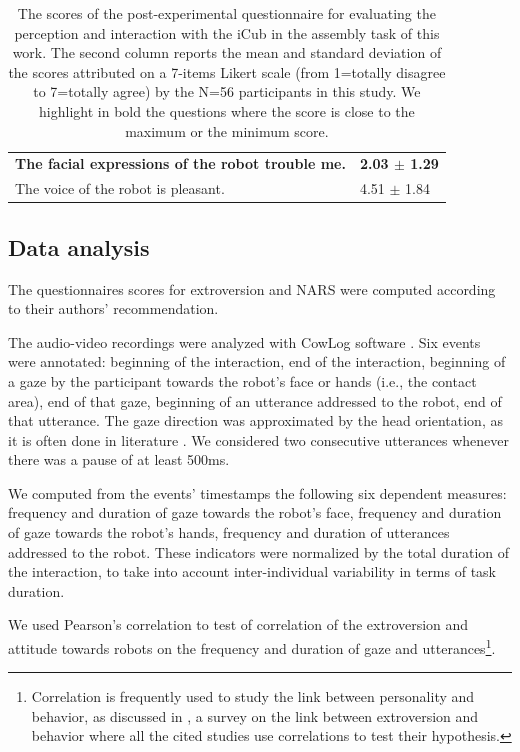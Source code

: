 \documentclass[twocolumn]{svjour3}          %
\begin{document}
\begin{table}
\begin{tabular}{|p{12cm}|p{3.5cm}|}
\textbf{The facial expressions of the robot trouble me.}& \textbf{2.03 $\pm$ 1.29}\\
 The voice of the robot is pleasant.& 4.51 $\pm$ 1.84\\
\hline
\end{tabular}
\caption{The scores of the post-experimental questionnaire for evaluating the perception and interaction with the iCub in the assembly task of this work. The second column reports the mean and standard deviation of the scores attributed on a 7-items Likert scale (from 1=totally disagree to 7=totally agree) by the N=56 participants in this study. We highlight in bold the questions where the score is close to the maximum or the minimum score.}
\label{table:postexperimentquestionnairescores}
\end{table}


\subsection{Data analysis}

The questionnaires scores for extroversion and NARS were computed according to their authors' recommendation. 

The audio-video recordings were analyzed with CowLog software \cite{CowLog2009}. 
 Six events were annotated: beginning of the interaction, end of the interaction, beginning of a gaze by the participant towards the robot's face or hands (i.e., the contact area), end of that gaze, beginning of an utterance addressed to the robot, end of that utterance. 
The gaze direction was approximated by the head orientation, as it is often done in literature \cite{ivaldi2014frontiers,Ba2009}. 
We considered two consecutive utterances whenever there was a pause of at least 500ms. 

We computed from the events' timestamps the following six dependent measures: frequency and duration of gaze towards the robot's face, frequency and duration of gaze towards the robot's hands, frequency and duration of utterances addressed to the robot. 
These indicators were normalized by the total duration of the interaction, to take into account inter-individual variability in terms of task duration.

We used Pearson's correlation to test of correlation of the extroversion and attitude towards robots on the frequency and duration of gaze and utterances\footnote{Correlation is frequently used to study the link between personality and behavior, as discussed in \cite{LaFrance2004}, a survey on the link between extroversion and behavior where all the cited studies use correlations to test their hypothesis.}.
\end{document}
